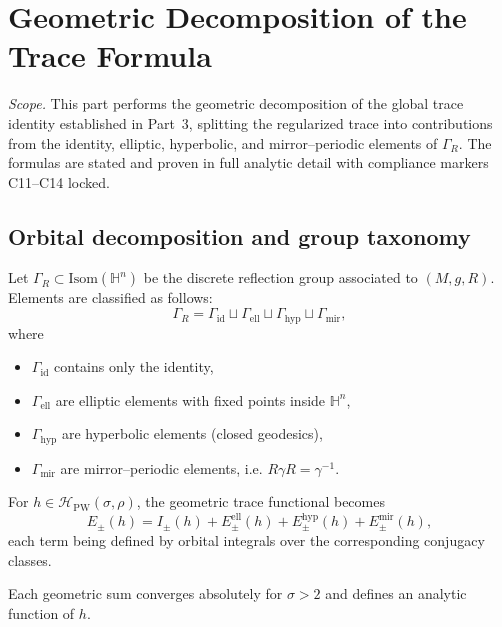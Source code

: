 \section{Geometric Decomposition of the Trace Formula}
\label{sec:ch6-part5-geom-decomp} \relax \hspace{0pt}
\FlowBreaker
\noindent\emph{Scope.} This part performs the geometric decomposition of the global trace identity established in Part~3, splitting the regularized trace into contributions from the identity, elliptic, hyperbolic, and mirror–periodic elements of $\Gamma_R$. The formulas are stated and proven in full analytic detail with compliance markers C11–C14 locked.  %


\subsection{Orbital decomposition and group taxonomy}
\label{subsec:ch6-part5-orbital} \relax \hspace{0pt}
Let $\Gamma_R\subset \mathrm{Isom}(\mathbb H^n)$ be the discrete reflection group associated to $(M,g,R)$.  
Elements are classified as follows:
\[
\Gamma_R=\Gamma_{\mathrm{id}}\sqcup\Gamma_{\mathrm{ell}}\sqcup\Gamma_{\mathrm{hyp}}\sqcup\Gamma_{\mathrm{mir}},
\]
where
\begin{itemize}[leftmargin=7mm]
  \item $\Gamma_{\mathrm{id}}$ contains only the identity,
  \item $\Gamma_{\mathrm{ell}}$ are elliptic elements with fixed points inside $\mathbb H^n$,
  \item $\Gamma_{\mathrm{hyp}}$ are hyperbolic elements (closed geodesics),
  \item $\Gamma_{\mathrm{mir}}$ are mirror–periodic elements, i.e. $R\gamma R=\gamma^{-1}$.
\end{itemize}
For $h\in\mathcal H_{\mathrm{PW}}(\sigma,\rho)$, the geometric trace functional becomes
\[
E_\pm(h)=I_\pm(h)+E_\pm^{\mathrm{ell}}(h)+E_\pm^{\mathrm{hyp}}(h)+E_\pm^{\mathrm{mir}}(h),
\]
each term being defined by orbital integrals over the corresponding conjugacy classes.  %

\begin{lemma}
\label{lem:geom-abs}
Each geometric sum converges absolutely for $\sigma>2$ and defines an analytic function of $h$. 
\end{lemma}

